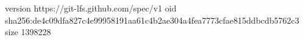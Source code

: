 version https://git-lfs.github.com/spec/v1
oid sha256:de4c09dfa827c4e99958191aa61c4b2ae304a4fea7773cfae815ddbcdb5762c3
size 1398228

